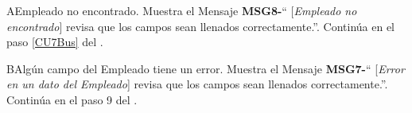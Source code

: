 

\begin{UCtrayectoriaA}{A}{Empleado no encontrado.}
			\UCpaso Muestra el Mensaje {\bf MSG8-}`` [{\em Empleado no encontrado}] revisa que los campos sean llenados correctamente.''.
			\UCpaso Continúa en el paso \ref{CU7Bus} del .
		\end{UCtrayectoriaA}


\begin{UCtrayectoriaA}{B}{Algún campo del Empleado tiene un error.}
			\UCpaso Muestra el Mensaje {\bf MSG7-}`` [{\em Error en un dato del Empleado}] revisa que los campos sean llenados correctamente.''.
			\UCpaso Continúa en el paso 9 del .
		\end{UCtrayectoriaA}
